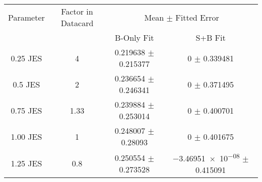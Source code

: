 \begin{scriptsize}
\begin{table}
\centering
\begin{tabular}{cccc}
\toprule
Parameter & Factor in Datacard & \multicolumn{2}{c}{{Mean $\pm$ Fitted Error}}\\
 & & {B-Only Fit} & {S+B Fit}\\
\midrule
\num[round-precision=2]{0.25} JES & 4 & \num{0.219638} $\pm$ \num{0.215377} & \num{0} $\pm$ \num{0.339481}\\
\num[round-precision=2]{0.5} JES & 2 & \num{0.236654} $\pm$ \num{0.246341} & \num{0} $\pm$ \num{0.371495}\\
\num[round-precision=2]{0.75} JES & \num[round-precision=2]{1.33} & \num{0.239884} $\pm$ \num{0.253014} & \num{0} $\pm$ \num{0.400701}\\
\num[round-precision=2]{1.00} JES & 1 & \num{0.248007} $\pm$ \num{0.28093} & \num{0} $\pm$ \num{0.401675}\\
\num[round-precision=2]{1.25} JES & \num[round-precision=2]{0.8} & \num{0.250554} $\pm$ \num{0.273528} & \num{-3.46951e-08} $\pm$ \num{0.415091}\\

\bottomrule
\end{tabular}
\end{table}
\end{scriptsize}
